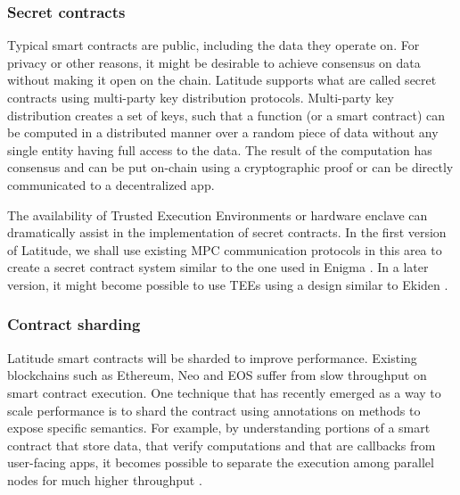 \subsubsection{Secret contracts}

Typical smart contracts are public, including the data they operate on. For privacy or other reasons, it might be
desirable to achieve consensus on data without making it open on the chain. Latitude supports what are called secret
contracts using multi-party key distribution protocols. Multi-party key distribution creates a set of keys, such that a
function (or a smart contract) can be computed in a distributed manner over a random piece of data without any single
entity having full access to the data. The result of the computation has consensus and can be put on-chain using a
cryptographic proof or can be directly communicated to a decentralized  app.

The availability of Trusted Execution Environments or hardware enclave can dramatically assist in the implementation of
secret contracts. In the first version of Latitude, we shall use existing MPC communication protocols in this area to
create a secret contract system similar to the one used in Enigma \cite{enigma}. In a later version, it might become
possible to use TEEs using a design similar to Ekiden \cite{ekiden}.



\subsubsection{Contract sharding}

Latitude smart contracts will be sharded to improve performance. Existing blockchains such as Ethereum, Neo and EOS
suffer from slow throughput on smart contract execution. One technique that has recently emerged as a way to scale
performance is to shard the contract using annotations on methods to expose specific semantics. For example, by
understanding portions of a smart contract that store data, that verify computations and that are callbacks from
user-facing apps, it becomes possible to separate the execution among parallel nodes for much higher throughput
\cite{chainspace}. 

